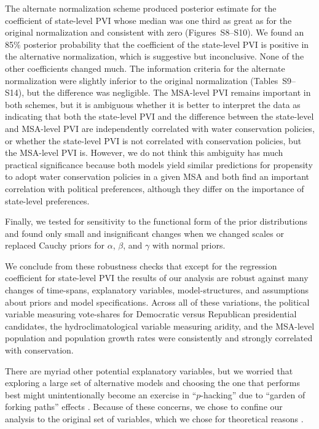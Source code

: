 \documentclass[draft,linenumbers]{agujournal}
\begin{document}
The alternate normalization scheme produced posterior estimate for the
coefficient of state-level PVI whose median was one third as great as for the original
normalization and consistent with zero (Figures~S8--S10).
We found an 85\% posterior probability that the coefficient of the state-level PVI
is positive in the alternative normalization, which is suggestive but inconclusive.
None of the other coefficients changed much.
The information criteria for the alternate normalization were
slightly inferior to
the original normalization (Tables~S9--S14),
but the difference was negligible. The
MSA-level PVI remains important in both schemes,
but it is ambiguous whether it is
better to interpret the data as indicating that both the state-level PVI
and the difference between the state-level and MSA-level PVI are independently
correlated with water conservation policies, or whether the state-level PVI
is not correlated with conservation policies, but the MSA-level PVI is.
However, we do not think this ambiguity has much practical significance
because both models yield similar predictions for propensity to adopt
water conservation policies in a given MSA and both find an important
correlation with political preferences, although they differ on the importance
of state-level preferences.

Finally, we tested for sensitivity to the functional form of the prior
distributions and found only small and insignificant changes when we
changed scales or replaced Cauchy priors for $\alpha$, $\beta$, and
$\gamma$ with normal priors.

We conclude from these robustness checks that
except for the regression coefficient for state-level PVI
the results
of our analysis are robust against many changes of time-spans,
explanatory variables, model-structures, and assumptions about priors
and model specifications.
Across all of these variations, the political variable measuring
vote-shares for Democratic versus Republican presidential candidates,
the hydroclimatological variable measuring aridity, and the
MSA-level population and population growth rates were
consistently and strongly correlated with conservation.

There are myriad other potential explanatory variables,
but we worried that exploring a large set of alternative models
and choosing the one that performs best might
unintentionally become an exercise in ``$p$-hacking'' due to
``garden of forking paths'' effects \citep{gelman:forking.paths:2014}.
Because of these concerns, we chose to confine our analysis to the original set
of variables, which we chose for theoretical reasons
\citep{hess:drought:2016}.
\end{document}
